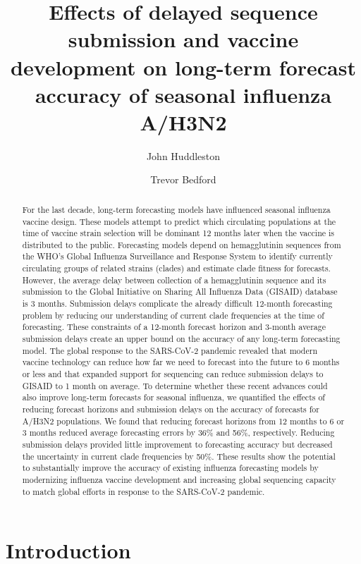 \documentclass[9pt,lineno]{elife}
\title{Effects of delayed sequence submission and vaccine development on long-term forecast accuracy of seasonal influenza A/H3N2}
\author[1*]{John Huddleston}
\author[2]{Trevor Bedford}
\affil[1]{Vaccine and Infectious Disease Division, Fred Hutchinson Cancer Center, Seattle, WA, USA}
\affil[2]{Howard Hughes Medical Institute, Seattle, WA, USA}
\begin{document}
\maketitle

\begin{abstract}
For the last decade, long-term forecasting models have influenced seasonal influenza vaccine design.
These models attempt to predict which circulating populations at the time of vaccine strain selection will be dominant 12 months later when the vaccine is distributed to the public.
Forecasting models depend on hemagglutinin sequences from the WHO’s Global Influenza Surveillance and Response System to identify currently circulating groups of related strains (clades) and estimate clade fitness for forecasts.
However, the average delay between collection of a hemagglutinin sequence and its submission to the Global Initiative on Sharing All Influenza Data (GISAID) database is 3 months.
Submission delays complicate the already difficult 12-month forecasting problem by reducing our understanding of current clade frequencies at the time of forecasting.
These constraints of a 12-month forecast horizon and 3-month average submission delays create an upper bound on the accuracy of any long-term forecasting model.
The global response to the SARS-CoV-2 pandemic revealed that modern vaccine technology can reduce how far we need to forecast into the future to 6 months or less and that expanded support for sequencing can reduce submission delays to GISAID to 1 month on average.
To determine whether these recent advances could also improve long-term forecasts for seasonal influenza, we quantified the effects of reducing forecast horizons and submission delays on the accuracy of forecasts for A/H3N2 populations.
We found that reducing forecast horizons from 12 months to 6 or 3 months reduced average forecasting errors by 36\% and 56\%, respectively.
Reducing submission delays provided little improvement to forecasting accuracy but decreased the uncertainty in current clade frequencies by 50\%.
These results show the potential to substantially improve the accuracy of existing influenza forecasting models by modernizing influenza vaccine development and increasing global sequencing capacity to match global efforts in response to the SARS-CoV-2 pandemic.
\end{abstract}

\section{Introduction}
\end{document}
